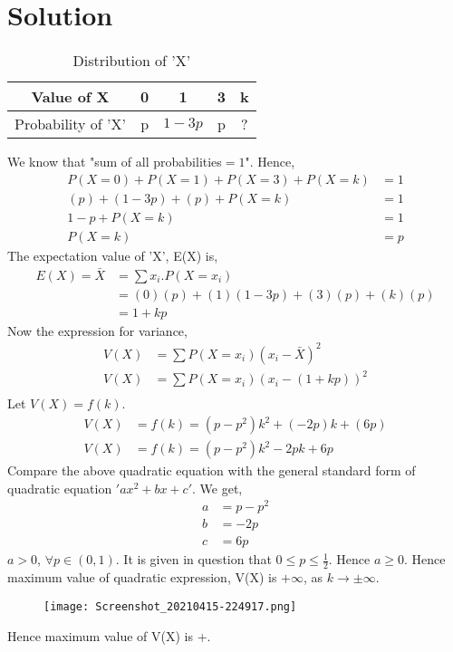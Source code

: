 \documentclass[journal,12pt,twocolumn]{IEEEtran}
\begin{document}
\section*{Solution}
\begin{table}[h]
    \centering

       \caption{Distribution of 'X'}

    \begin{tabular}{|c|c|c|c|c|}
    \hline
        Value of X & 0 & 1 & 3 & k\\
        \hline
        Probability of 'X'& p & $1-3p$ & p & ?\\
        
        \hline
    \end{tabular}
\end{table}
We know that "sum of all probabilities$=1$". Hence,
\begin{align}
    P(X=0)+P(X=1)+P(X=3)+P(X=k) &=1 \\
    (p)+(1-3p)+(p)+P(X=k) &= 1 \\
    1-p+P(X=k) &= 1\\
    P(X=k) &=p
\end{align}
The expectation value of 'X', E(X) is,
\begin{align}
    E(X)={\bar{X}} &={\sum}x_i.P(X=x_i)\\
    &=(0)(p)+(1)(1-3p)+(3)(p)+(k)(p)\\
    &=1+kp
\end{align}
Now the expression for variance,
\begin{align}
    V(X)&={\sum}P(X=x_i)(x_i-\bar{X})^2\\
    V(X)&={\sum}P(X=x_i)(x_i-(1+kp))^2\\
\end{align}
Let $V(X)=f(k)$.
\begin{align}
    V(X)&=f(k)=(p-p^2)k^2+(-2p)k+(6p)\\
    V(X)&=f(k)=(p-p^2)k^2-2pk+6p
\end{align}
Compare the above quadratic equation with the general standard form of quadratic equation $'ax^2+bx+c'$. We get,
\begin{align}
    a&=p-p^2\\
    b&=-2p\\
    c&=6p
\end{align}
$a>0$, $\forall p{\in}(0,1)$. It is given in question that $0{\leq}p{\leq}\frac{1}{2}$. Hence $a{\geq}0$. Hence maximum value of quadratic expression, V(X) is ${+\infty}$, as $k{\rightarrow}{\pm}{\infty}$.
\begin{figure}[H]
\centering
\texttt{[image: Screenshot\_20210415-224917.png]}


\end{figure}
Hence maximum value of V(X) is +\infty.\\
\\
\end{document}
